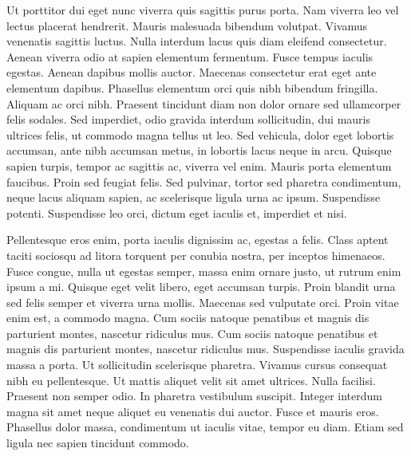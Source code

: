 Ut porttitor dui eget nunc viverra quis sagittis purus porta. Nam
viverra leo vel lectus placerat hendrerit. Mauris malesuada bibendum
volutpat. Vivamus venenatis sagittis luctus. Nulla interdum lacus quis
diam eleifend consectetur. Aenean viverra odio at sapien elementum
fermentum. Fusce tempus iaculis egestas. Aenean dapibus mollis
auctor. Maecenas consectetur erat eget ante elementum
dapibus. Phasellus elementum orci quis nibh bibendum
fringilla. Aliquam ac orci nibh. Praesent tincidunt diam non dolor
ornare sed ullamcorper felis sodales. Sed imperdiet, odio gravida
interdum sollicitudin, dui mauris ultrices felis, ut commodo magna
tellus ut leo. Sed vehicula, dolor eget lobortis accumsan, ante nibh
accumsan metus, in lobortis lacus neque in arcu. Quisque sapien
turpis, tempor ac sagittis ac, viverra vel enim. Mauris porta
elementum faucibus. Proin sed feugiat felis. Sed pulvinar, tortor sed
pharetra condimentum, neque lacus aliquam sapien, ac scelerisque
ligula urna ac ipsum. Suspendisse potenti. Suspendisse leo orci,
dictum eget iaculis et, imperdiet et nisi.

Pellentesque eros enim, porta iaculis dignissim ac, egestas a
felis. Class aptent taciti sociosqu ad litora torquent per conubia
nostra, per inceptos himenaeos. Fusce congue, nulla ut egestas semper,
massa enim ornare justo, ut rutrum enim ipsum a mi. Quisque eget velit
libero, eget accumsan turpis. Proin blandit urna sed felis semper et
viverra urna mollis. Maecenas sed vulputate orci. Proin vitae enim
est, a commodo magna. Cum sociis natoque penatibus et magnis dis
parturient montes, nascetur ridiculus mus. Cum sociis natoque
penatibus et magnis dis parturient montes, nascetur ridiculus
mus. Suspendisse iaculis gravida massa a porta. Ut sollicitudin
scelerisque pharetra. Vivamus cursus consequat nibh eu
pellentesque. Ut mattis aliquet velit sit amet ultrices. Nulla
facilisi. Praesent non semper odio. In pharetra vestibulum
suscipit. Integer interdum magna sit amet neque aliquet eu venenatis
dui auctor. Fusce et mauris eros. Phasellus dolor massa, condimentum
ut iaculis vitae, tempor eu diam. Etiam sed ligula nec sapien
tincidunt commodo.


